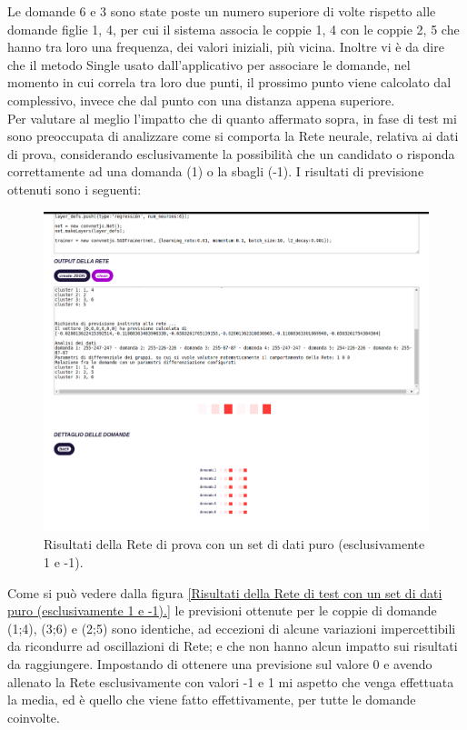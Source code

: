 Le domande 6 e 3 sono state poste un numero superiore di volte rispetto alle domande figlie 1, 4, per cui il sistema associa le coppie 1, 4 con le coppie 2, 5 che hanno tra loro una frequenza, dei valori iniziali, pi\`u vicina. Inoltre vi \`e da dire che il metodo Single usato dall'applicativo per associare le domande, nel momento in cui correla tra loro due punti, il prossimo punto viene calcolato dal complessivo, invece che dal punto con una distanza appena superiore.\\
Per valutare al meglio l'impatto che di quanto affermato sopra, in fase di test mi sono preoccupata di analizzare come si comporta la Rete neurale, relativa ai dati di prova, considerando esclusivamente la possibilit\`a che un candidato o risponda correttamente ad una domanda (1) o la sbagli (-1). I risultati di previsione ottenuti sono i seguenti:
\begin{figure}[H]
\centering
	\includegraphics[width=1\linewidth]{./image/RetediProva_generatorinputpuro.png}
	\caption{Risultati della Rete di prova con un set di dati puro (esclusivamente 1 e -1).}
	\label{Risultati della Rete di prova con un set di dati puro (esclusivamente 1 e -1).}
	\end{figure}
	\noindent
Come si pu\`o vedere dalla figura \ref{Risultati della Rete di test con un set di dati puro (esclusivamente 1 e -1).} le previsioni ottenute per le coppie di domande (1;4), (3;6) e (2;5) sono identiche, ad eccezioni di alcune variazioni impercettibili da ricondurre ad oscillazioni di Rete; e che non hanno alcun impatto sui risultati da raggiungere. Impostando di ottenere una previsione sul valore 0 e avendo allenato la Rete esclusivamente con valori -1 e 1 mi aspetto che venga effettuata la media, ed \`e quello che viene fatto effettivamente, per tutte le domande coinvolte.
